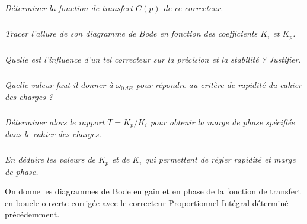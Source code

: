 \documentclass[10pt,fleqn]{article} %
\begin{document}
\begin{multicols}{2}
\subparagraph{}
\textit{Déterminer la fonction de transfert $C(p)$ de ce correcteur.}
\ifprof
\begin{corrige}

\end{corrige}
\else
\fi

\subparagraph{}
\textit{Tracer l’allure de son diagramme de Bode en fonction des coefficients $K_i$ et $K_p$.}
\ifprof
\begin{corrige}

\end{corrige}
\else
\fi

\subparagraph{}
\textit{Quelle est l’influence d’un tel correcteur sur la précision et la stabilité ? Justifier.}
\ifprof
\begin{corrige}

\end{corrige}
\else
\fi

\subparagraph{}
\textit{Quelle valeur faut-il donner à $\omega_{\SI{0}{dB}}$ pour répondre au critère de rapidité du cahier des charges ?}
\ifprof
\begin{corrige}

\end{corrige}
\else
\fi

\subparagraph{}
\textit{Déterminer alors le rapport $T=K_p/K_i$ pour obtenir la marge de phase spécifiée dans le cahier des charges.}
\ifprof
\begin{corrige}

\end{corrige}
\else
\fi

\subparagraph{}
\textit{En déduire les valeurs de $K_p$ et de $K_i$ qui permettent de régler rapidité et marge de phase.}
\ifprof
\begin{corrige}

\end{corrige}
\else
\fi


On donne les diagrammes de Bode en gain et en phase de la fonction de transfert en boucle ouverte corrigée avec le correcteur Proportionnel Intégral déterminé précédemment.


\end{multicols}
\end{document}
